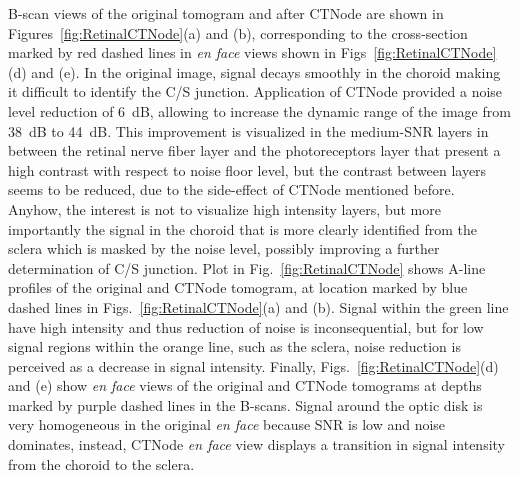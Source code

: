 B-scan views of the original tomogram and after CTNode are shown in Figures~\ref{fig:RetinalCTNode}(a) and (b), corresponding to the cross-section marked by red dashed lines in \textit{en face} views shown in Figs~\ref{fig:RetinalCTNode}(d) and (e). In the original image, signal decays smoothly in the choroid making it difficult to identify the C/S junction. Application of CTNode provided a noise level reduction of 6~dB, allowing to increase the dynamic range of the image from 38~dB to 44~dB. This improvement is visualized in the medium-SNR layers in between the retinal nerve fiber layer and the photoreceptors layer that present a high contrast with respect to noise floor level, but the contrast between layers seems to be reduced, due to the side-effect of CTNode mentioned before. Anyhow, the interest is not to visualize high intensity layers, but more importantly the signal in the choroid that is more clearly identified from the sclera which is masked by the noise level, possibly improving a further determination of C/S junction. Plot in Fig.~\ref{fig:RetinalCTNode} shows A-line profiles of the original and CTNode tomogram, at location marked by blue dashed lines in Figs.~\ref{fig:RetinalCTNode}(a) and (b). Signal within the green line have high intensity and thus reduction of noise is inconsequential, but for low signal regions within the orange line, such as the sclera, noise reduction is perceived as a decrease in signal intensity. Finally, Figs.~\ref{fig:RetinalCTNode}(d) and (e) show \textit{en face} views of the original and CTNode tomograms at depths marked by purple dashed lines in the B-scans. Signal around the optic disk is very homogeneous in the original \textit{en face} because SNR is low and noise dominates, instead, CTNode \textit{en face} view displays a transition in signal intensity from the choroid to the sclera. 

